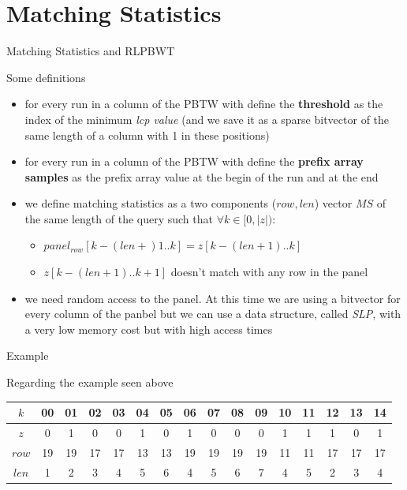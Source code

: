 \documentclass{beamer}
\begin{document}
\section{Matching Statistics}
\begin{frame}{Matching Statistics and RLPBWT}
  \begin{block}{Some definitions}
    \begin{itemize}
      \item for every run in a column of the PBTW with define the
      \textbf{threshold} as the index of the minimum \textit{lcp value} (and we
      save it as a sparse bitvector of the same length of a column with 1 in
      these positions)
      \item for every run in a column of the PBTW with define the
      \textbf{prefix array samples} as the prefix array value at the begin of the
      run and at the end
      \item we define matching statistics as a two components ($row, len$) vector $MS$ of the
      same length of the query such that $\forall k\in[0,|z|)$: 
      \begin{itemize}
        \item $panel_{row}[k-(len+)1..k]=z[k-(len+1)..k]$
        \item $z[k-(len+1)..k+1]$ doesn't match with any row in the panel 
      \end{itemize}
      \item we need random access to the panel. At this time we are using a
      bitvector for every column of the panbel but we can use a data structure,
      called \textit{SLP}, with a very low memory cost but with high access
      times  
    \end{itemize}
  \end{block}
\end{frame}
\begin{frame}{Example}
  \begin{block}{Regarding the example seen above}
    \begin{table}[H]
      \footnotesize{}
      \centering
      \begin{tabular}{c|ccccccccccccccc}
        $k$ & 00 & 01 & 02 & 03 & 04 &  {\color{nordred}05} & 06 & 07 & 08
        &  {\color{nordgreen}09} & 10 &  {\color{nordgreen}11} & 12 & 13
        &  {\color{nordgreen}14} \\
        \hline
        $z$ & 0 & 1 & 0 & 0 & 1 &  {\color{nordgreen}0} & 1 & 0 & 0
        &  {\color{nordgreen}0} & 1 &  {\color{nordgreen}1} & 1 & 0
        &  {\color{nordgreen}1} \\
        $row$ & 19 & 19 & 17 & 17 & 13 &  {\color{nordgreen}13} & 19 & 19 & 19
        &  {\color{nordgreen}19} & 11 &  {\color{nordgreen}11} & 17 & 17
        &  {\color{nordgreen}17} \\
        $len$ & 1 & 2 & 3 & 4 & 5 & {\color{nordgreen}6} & 4 & 5 & 6
        & {\color{nordgreen}7} & 4 & {\color{nordgreen}5} & 2 & 3
        & {\color{nordgreen}4}\\
      \end{tabular}
    \end{table}
\end{block}
\end{frame}
%   
%   
\end{document}
